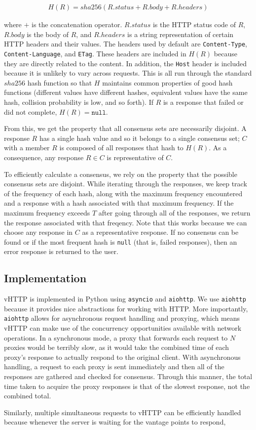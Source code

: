 \begin{align*}
  H(R) = sha256(R.status + R.body + R.headers)
\end{align*}

where $+$ is the concatenation operator. $R.status$ is the HTTP status code of
$R$, $R.body$ is the body of $R$, and $R.headers$ is a string representation
of certain HTTP headers and their values. The headers used by default are
\texttt{Content-Type}, \texttt{Content-Language}, and \texttt{ETag}. These
headers are included in $H(R)$ because they are directly related to the
content. In addition, the \texttt{Host} header is included because it is
unlikely to vary across requests. This is all run through the standard $sha256$
hash function so that $H$ maintains common properties of good hash functions
(different values have different hashes, equivalent values have the same hash,
collision probability is low, and so forth). If $R$ is a response that failed
or did not complete, $H(R) = \texttt{null}$.

From this, we get the property that all consensus sets are necessarily
disjoint. A response $R$ has a single hash value and so it belongs to a single
consensus set; $C$ with a member $R$ is composed of all responses that hash to
$H(R)$. As a consequence, any response $R \in C$ is representative of $C$.

To efficiently calculate a consensus, we rely on the property that the possible
consensus sets are disjoint. While iterating through the responses, we
keep track of the frequency of each hash, along with the maximum frequency
encountered and a response with a hash associated with that maximum frequency.
If the maximum frequency exceeds $T$ after going through all of the responses,
we return the response associated with that freqency. Note that this works
because we can choose any response in $C$ as a representative response.
If no consensus can be found or if the most frequent hash is \texttt{null}
(that is, failed responses), then an error response is returned to the user.



\subsection{Implementation}

vHTTP is implemented in Python using \texttt{asyncio} and \texttt{aiohttp}.
We use \texttt{aiohttp} because it provides nice abstractions for working with
HTTP. More importantly, \texttt{aiohttp} allows for asynchronous request
handling and proxying, which means vHTTP can make use of the concurrency
opportunities available with network operations. In a synchronous mode, a
proxy that forwards each request to $N$ proxies would be terribly slow, as it
would take the combined time of each proxy's response to actually respond to
the original client. With asynchronous handling, a request to each proxy is
sent immediately and then all of the responses are gathered and checked for
consensus. Through this manner, the total time taken to acquire the proxy
responses is that of the slowest response, not the combined total.

Similarly, multiple simultaneous requests to vHTTP can be efficiently handled
because whenever the server is waiting for the vantage points to respond, 
